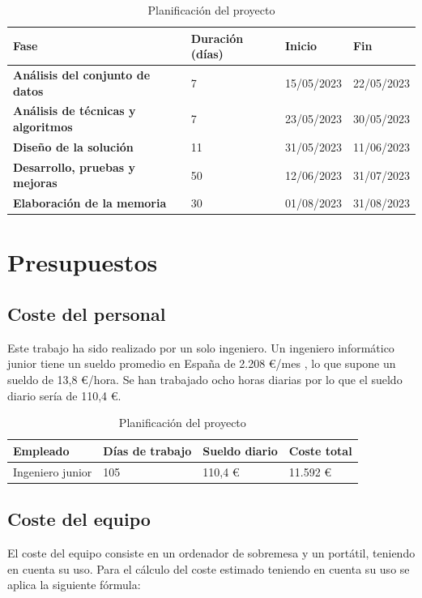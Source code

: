 \documentclass[12pt]{report} %
\begin{document}
	\begin{table}[H]
		\centering
		\caption{Planificación del proyecto}
		\begin{tabular}{llll}
				\toprule
				\textbf{Fase} & \textbf{Duración (días)} & \textbf{Inicio} & \textbf{Fin}\\
				\midrule
				\textbf{Análisis del conjunto de datos} & 7 & 15/05/2023 & 22/05/2023  \\
				\textbf{Análisis de técnicas y algoritmos} & 7 & 23/05/2023 & 30/05/2023 \\
				\textbf{Diseño de la solución} & 11 & 31/05/2023 & 11/06/2023 \\
				\textbf{Desarrollo, pruebas y mejoras} & 50 & 12/06/2023 & 31/07/2023 \\
				\textbf{Elaboración de la memoria} & 30 & 01/08/2023 & 31/08/2023 \\
				\bottomrule
		\end{tabular}
	\end{table}

	\section{Presupuestos}
	
	\subsection{Coste del personal}
	Este trabajo ha sido realizado por un solo ingeniero. Un ingeniero informático junior tiene un sueldo promedio en España
	de 2.208 €/mes \cite{sueldo}, lo que supone un sueldo de 13,8 €/hora. Se han trabajado ocho horas diarias por lo que el sueldo
	diario sería de 110,4 €.

	\begin{table}[H]
		\centering
		\caption{Planificación del proyecto}
		\begin{tabular}{llll}
				\toprule
				\textbf{Empleado} & \textbf{Días de trabajo} & \textbf{Sueldo diario} & \textbf{Coste total}\\
				\midrule
				Ingeniero junior & 105 & 110,4 € & 11.592 €  \\
				\bottomrule
		\end{tabular}
	\end{table}

	\subsection{Coste del equipo}
	El coste del equipo consiste en un ordenador de sobremesa y un portátil, teniendo en cuenta su uso.
	Para el cálculo del coste estimado teniendo en cuenta su uso se aplica la siguiente fórmula:
\end{document}
